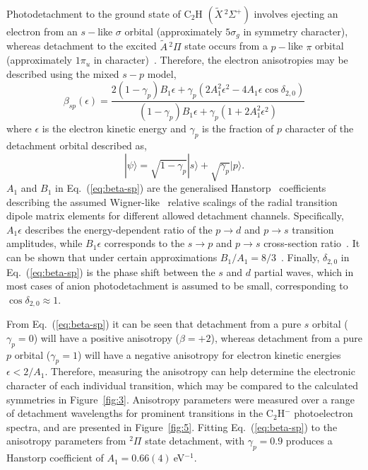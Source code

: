 \documentclass[aip,graphicx]{revtex4-1}
\begin{document}
Photodetachment to the ground state of C$_2$H $(\tilde{X}\,^2\Sigma^+)$ involves ejecting an electron from an $s-$like $\sigma$ orbital (approximately $5\sigma_g$ in symmetry character), whereas detachment to the excited $\tilde{A}\,^2\Pi$ state occurs from a $p-$like $\pi$ orbital (approximately $1\pi_u$ in character)~\cite{gul21}. Therefore, the electron anisotropies may be described using the mixed $s-p$ model\cite{khu14},
\begin{equation}
\beta_{sp}(\epsilon) = \frac{2(1-\gamma_p)B_1\epsilon + \gamma_p(2A_1^2\epsilon^2-4A_1\epsilon\cos\delta_{2,0})}
{(1-\gamma_p)B_1\epsilon+\gamma_p(1+2A_1^2\epsilon^2)}
\label{eq:beta-sp}
\end{equation}
where $\epsilon$ is the electron kinetic energy and $\gamma_p$ is the fraction of $p$ character of the detachment orbital described as,
\begin{equation}
|\psi\rangle = \sqrt{1-\gamma_p}|s\rangle + \sqrt{\gamma_p}|p\rangle.
\end{equation}
$A_1$ and $B_1$ in Eq.~(\ref{eq:beta-sp}) are the generalised Hanstorp~\cite{han89} coefficients describing the assumed Wigner-like~\cite{wig48} relative scalings of the radial transition dipole matrix elements for different allowed detachment channels. Specifically, $A_1\epsilon$ describes the energy-dependent ratio of the $p\rightarrow d$ and $p\rightarrow s$ transition amplitudes, while $B_1\epsilon$ corresponds to the $s\rightarrow p$ and $p\rightarrow s$ cross-section ratio~\cite{khu14}. It can be shown that under certain approximations $B_1/A_1 = 8/3$~\cite{san13}. Finally, $\delta_{2,0}$ in Eq.~(\ref{eq:beta-sp}) is the phase shift between the $s$ and $d$ partial waves, which in most cases of anion photodetachment is assumed to be small, corresponding to $\cos\delta_{2,0}\approx1$.

From Eq.~(\ref{eq:beta-sp}) it can be seen that detachment from a pure $s$ orbital ($\gamma_p=0$) will have a positive anisotropy ($\beta = +2$), whereas detachment from a pure $p$ orbital ($\gamma_p=1$) will have a negative anisotropy for electron kinetic energies $\epsilon < 2/A_1$. Therefore, measuring the anisotropy can help determine the electronic character of each individual transition, which may be compared to the calculated symmetries in Figure~\ref{fig:3}. Anisotropy parameters were measured over a range of detachment wavelengths for prominent transitions in the C$_2$H$^-$ photoelectron spectra, and are presented in Figure~\ref{fig:5}. Fitting Eq.~(\ref{eq:beta-sp}) to the anisotropy parameters from $^2\Pi$ state detachment, with $\gamma_p = 0.9$ produces a Hanstorp coefficient of $A_1=0.66(4)~$eV$^{-1}$.
\end{document}
